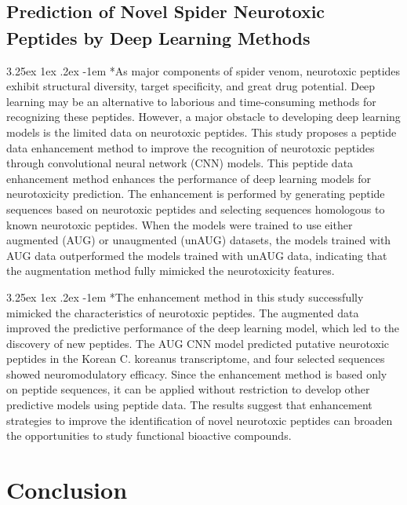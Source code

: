 \documentclass{article}
\makeatletter
\renewcommand\paragraph{\@startsection{paragraph}{4}{\z@}%
	{3.25ex \@plus1ex \@minus.2ex}%
	{-1em}%
	{\normalfont\normalsize}}
\makeatother
\begin{document}
		\subsection*{Prediction of Novel Spider Neurotoxic Peptides by Deep Learning Methods\textsuperscript{\cite{ref8}}}
		
		\paragraph*{As major components of spider venom, neurotoxic peptides exhibit structural diversity, target specificity, and great drug potential. Deep learning may be an alternative to laborious and time-consuming methods for recognizing these peptides. However, a major obstacle to developing deep learning models is the limited data on neurotoxic peptides. This study proposes a peptide data enhancement method to improve the recognition of neurotoxic peptides through convolutional neural network (CNN) models. This peptide data enhancement method enhances the performance of deep learning models for neurotoxicity prediction. The enhancement is performed by generating peptide sequences based on neurotoxic peptides and selecting sequences homologous to known neurotoxic peptides. When the models were trained to use either augmented (AUG) or unaugmented (unAUG) datasets, the models trained with AUG data outperformed the models trained with unAUG data, indicating that the augmentation method fully mimicked the neurotoxicity features.}
		
		\paragraph*{The enhancement method in this study successfully mimicked the characteristics of neurotoxic peptides. The augmented data improved the predictive performance of the deep learning model, which led to the discovery of new peptides. The AUG CNN model predicted putative neurotoxic peptides in the Korean C. koreanus transcriptome, and four selected sequences showed neuromodulatory efficacy. Since the enhancement method is based only on peptide sequences, it can be applied without restriction to develop other predictive models using peptide data. The results suggest that enhancement strategies to improve the identification of novel neurotoxic peptides can broaden the opportunities to study functional bioactive compounds.}
		
		\section*{Conclusion}
		
\end{document}
